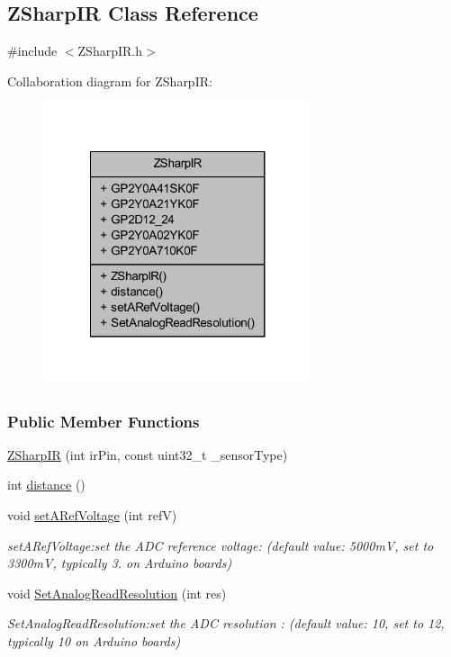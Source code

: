 \hypertarget{class_z_sharp_i_r}{}\subsection{Z\+Sharp\+IR Class Reference}
\label{class_z_sharp_i_r}


{\ttfamily \#include $<$Z\+Sharp\+I\+R.\+h$>$}



Collaboration diagram for Z\+Sharp\+IR\+:\nopagebreak
\begin{figure}[H]
\begin{center}
\leavevmode
\includegraphics[width=224pt]{class_z_sharp_i_r__coll__graph}
\end{center}
\end{figure}
\subsubsection*{Public Member Functions}
\begin{DoxyCompactItemize}
\item 
\mbox{\hyperlink{class_z_sharp_i_r_a988604b3702878f8af55ba939ea3efb0}{Z\+Sharp\+IR}} (int ir\+Pin, const uint32\+\_\+t \+\_\+sensor\+Type)
\item 
int \mbox{\hyperlink{class_z_sharp_i_r_aae48083d6920e98c1b657de9e03b2254}{distance}} ()
\item 
void \mbox{\hyperlink{class_z_sharp_i_r_a20db1d8e739e9799704e78345f2858a8}{set\+A\+Ref\+Voltage}} (int refV)
\begin{DoxyCompactList}\small\item\em set\+A\+Ref\+Voltage\+:set the A\+DC reference voltage\+: (default value\+: 5000mV, set to 3300mV, typically 3. on Arduino boards) \end{DoxyCompactList}\item 
void \mbox{\hyperlink{class_z_sharp_i_r_a0121005326fb7d981fcf739730a69ac1}{Set\+Analog\+Read\+Resolution}} (int res)
\begin{DoxyCompactList}\small\item\em Set\+Analog\+Read\+Resolution\+:set the A\+DC resolution \+: (default value\+: 10, set to 12, typically 10 on Arduino boards) \end{DoxyCompactList}\end{DoxyCompactItemize}
